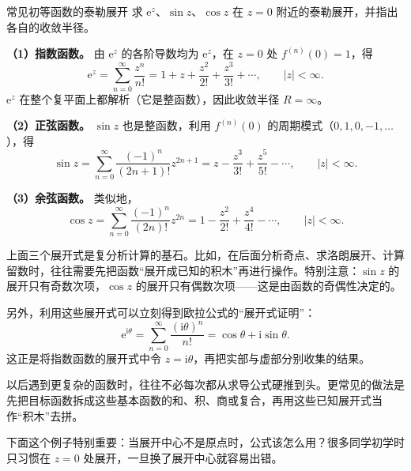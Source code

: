 \begin{lizi}{常见初等函数的泰勒展开}{}
求 $\mathrm{e}^z$、$\sin z$、$\cos z$ 在 $z=0$ 附近的泰勒展开，并指出各自的收敛半径。

\begin{jie}
\textbf{（1）指数函数。} 由 $\mathrm{e}^z$ 的各阶导数均为 $\mathrm{e}^z$，在 $z=0$ 处 $f^{(n)}(0)=1$，得
\begin{equation}\label{eq:taylor-exp}
    \mathrm{e}^z = \sum_{n=0}^{\infty} \frac{z^n}{n!} = 1 + z + \frac{z^2}{2!} + \frac{z^3}{3!} + \cdots, \qquad |z|<\infty.
\end{equation}
$\mathrm{e}^z$ 在整个复平面上都解析（它是整函数），因此收敛半径 $R=\infty$。

\textbf{（2）正弦函数。} $\sin z$ 也是整函数，利用 $f^{(n)}(0)$ 的周期模式（$0,1,0,-1,\ldots$），得
\begin{equation}\label{eq:taylor-sin}
    \sin z = \sum_{n=0}^{\infty} \frac{(-1)^n}{(2n+1)!} z^{2n+1} = z - \frac{z^3}{3!} + \frac{z^5}{5!} - \cdots, \qquad |z|<\infty.
\end{equation}

\textbf{（3）余弦函数。} 类似地，
\begin{equation}\label{eq:taylor-cos}
    \cos z = \sum_{n=0}^{\infty} \frac{(-1)^n}{(2n)!} z^{2n} = 1 - \frac{z^2}{2!} + \frac{z^4}{4!} - \cdots, \qquad |z|<\infty.
\end{equation}
\end{jie}
\end{lizi}

\begin{tishi}[这些展开式的重要性]
上面三个展开式是复分析计算的基石。比如，在后面分析奇点、求洛朗展开、计算留数时，往往需要先把函数``展开成已知的积木''再进行操作。特别注意：$\sin z$ 的展开只有奇数次项，$\cos z$ 的展开只有偶数次项——这是由函数的奇偶性决定的。

另外，利用这些展开式可以立刻得到欧拉公式的``展开式证明''：
\[
    \mathrm{e}^{\mathrm{i}\theta} = \sum_{n=0}^{\infty} \frac{(\mathrm{i}\theta)^n}{n!} = \cos\theta + \mathrm{i}\sin\theta.
\]
这正是将指数函数的展开式中令 $z=\mathrm{i}\theta$，再把实部与虚部分别收集的结果。
\end{tishi}

\begin{zhu}{}{}
以后遇到更复杂的函数时，往往不必每次都从求导公式硬推到头。更常见的做法是先把目标函数拆成这些基本函数的和、积、商或复合，再用这些已知展开式当作``积木''去拼。
\end{zhu}

下面这个例子特别重要：当展开中心不是原点时，公式该怎么用？很多同学初学时只习惯在 $z=0$ 处展开，一旦换了展开中心就容易出错。

